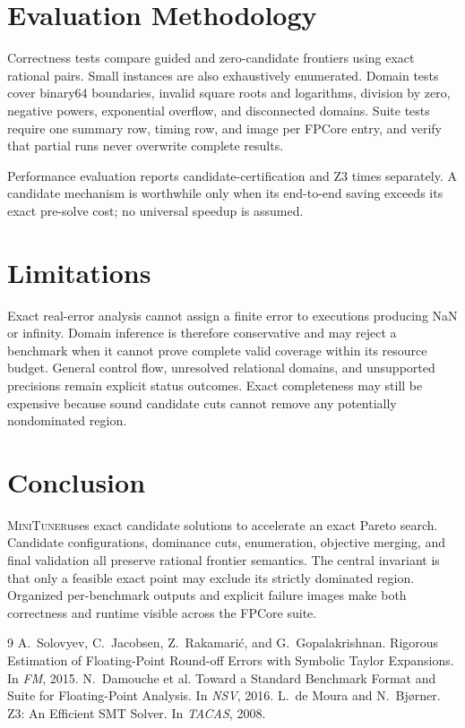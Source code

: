 \documentclass[10pt]{article}
\newcommand{\tool}{\textsc{MiniTuner}}
\begin{document}
\section{Evaluation Methodology}

Correctness tests compare guided and zero-candidate frontiers using exact
rational pairs. Small instances are also exhaustively enumerated. Domain tests
cover binary64 boundaries, invalid square roots and logarithms, division by
zero, negative powers, exponential overflow, and disconnected domains. Suite
tests require one summary row, timing row, and image per FPCore entry, and
verify that partial runs never overwrite complete results.

Performance evaluation reports candidate-certification and Z3 times
separately. A candidate mechanism is worthwhile only when its end-to-end saving
exceeds its exact pre-solve cost; no universal speedup is assumed.

\section{Limitations}

Exact real-error analysis cannot assign a finite error to executions producing
NaN or infinity. Domain inference is therefore conservative and may reject a
benchmark when it cannot prove complete valid coverage within its resource
budget. General control flow, unresolved relational domains, and unsupported
precisions remain explicit status outcomes. Exact completeness may still be
expensive because sound candidate cuts cannot remove any potentially
nondominated region.

\section{Conclusion}

\tool uses exact candidate solutions to accelerate an exact Pareto search.
Candidate configurations, dominance cuts, enumeration, objective merging, and
final validation all preserve rational frontier semantics. The central
invariant is that only a feasible exact point may exclude its strictly
dominated region. Organized per-benchmark outputs and explicit failure images
make both correctness and runtime visible across the FPCore suite.

\begin{thebibliography}{9}
A.~Solovyev, C.~Jacobsen, Z.~Rakamari\'c, and G.~Gopalakrishnan.
Rigorous Estimation of Floating-Point Round-off Errors with Symbolic Taylor
Expansions. In \emph{FM}, 2015.
N.~Damouche et al. Toward a Standard Benchmark Format and Suite for
Floating-Point Analysis. In \emph{NSV}, 2016.
L.~de Moura and N.~Bj\o{}rner. Z3: An Efficient SMT Solver. In \emph{TACAS},
2008.
\end{thebibliography}
\end{document}
